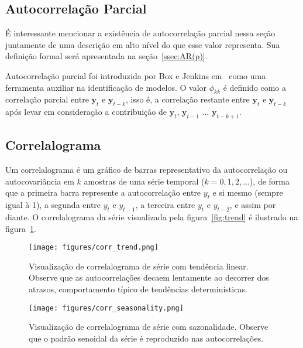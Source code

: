 \vspace{1cm}

\subsection{Autocorrelação Parcial}

É interessante mencionar a existência de autocorrelação parcial nessa seção
juntamente de uma descrição em alto nível do que esse valor representa. Sua
definição formal será apresentada na seção~\ref{ssec:AR(p)}.

Autocorrelação parcial foi introduzida por Box e Jenkins em~\cite{box} como uma
ferramenta auxiliar na identificação de modelos. O valor $\phi_{kk}$ é
definido como a correlação parcial entre $\mathbf{y}_t$ e $\mathbf{y}_{t - k}$,
isso é, a correlação restante entre $\mathbf{y}_t$ e $\mathbf{y}_{t - k}$ após
levar em consideração a contribuição de $\mathbf{y}_t$, $\mathbf{y}_{t - 1}$
$...$ $\mathbf{y}_{t - k + 1}$.

\subsection{Correlalograma}\label{ssec:correlalogram}

Um correlalograma é um gráfico de barras representativo da autocorrelação ou
autocovariância em $k$ amostras de uma série temporal ($k=0, 1, 2, \dots$), de
forma que a primeira barra represente a autocorrelação entre $y_t$ e si mesmo
(sempre igual à 1), a segunda entre $y_t$ e $y_{t-1}$, a terceira entre $y_t$ e
$y_{t-2}$, e assim por diante. O correlalograma da série visualizada pela
figura~\ref{fig:trend} é ilustrado na figura~\ref{fig:correlalogram}.

\begin{figure}
    \centering
    \texttt{[image: figures/corr\_trend.png]}
    \caption{Visualização de correlalograma de série com tendência linear.
    Observe que as autocorrelações decaem lentamente ao decorrer dos atrasos,
    comportamento típico de tendências determinísticas.}
    \label{fig:correlalogram}
\end{figure}

\begin{figure}
    \centering
    \texttt{[image: figures/corr\_seasonality.png]}
    \caption{Visualização de correlalograma de série com sazonalidade.
    Observe que o padrão senoidal da série é reproduzido nas autocorrelações.}
    \label{fig:corr_season}
\end{figure}

